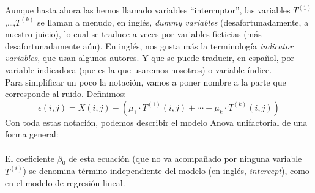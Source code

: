 Aunque hasta ahora las hemos llamado variables ``interruptor'', las variables $T^{(1)}$,\ldots,$T^{(k)}$ se llaman a menudo, en inglés, {\em dummy variables} (desafortunadamente,
a nuestro juicio), lo cual se traduce a veces  por {\sf variables ficticias} (más desafortunadamente aún). En inglés, nos gusta más la terminología {\em indicator variables}, que usan algunos autores. Y que se puede traducir, en español,
por {\sf variable indicadora} (que es la que
usaremos nosotros) o {\sf variable índice}.\\

Para simplificar un poco la notación, vamos a poner nombre a la parte que corresponde al ruido. Definimos:
\[
\epsilon(i,j)=
X(i,j) - \left(\mu_1\cdot T^{(1)}(i,j)+\cdots+\mu_k\cdot T^{(k)}(i,j)\right)
\]
Con toda estas notación, podemos describir el modelo Anova unifactorial de una forma general:\\

    \\[3mm]
El coeficiente $\beta_0$ de esta ecuación (que no va acompañado por ninguna variable $T^{(i)}$) se denomina {\sf término independiente} del  modelo (en inglés, {\em intercept}), como en el modelo de regresión lineal.


